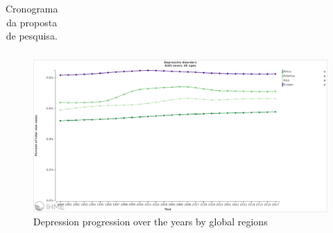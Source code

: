 \documentclass[11pt, notitlepage]{article} %
\begin{document}
\begin{table}[!ht]
\begin{tabular}{cllll}
  \end{tabular}
  \caption{Cronograma da proposta de pesquisa.}
  \label{tab:Cronograma}
  \end{table}


\newpage

\appendix
\begin{figure}
	\centering
	\includegraphics[scale=.24]{Figures/depressionprogression.png}
	\caption{Depression progression over the years by global regions} 
	\label{fig:depressionmap}
\end{figure}
\end{document}
